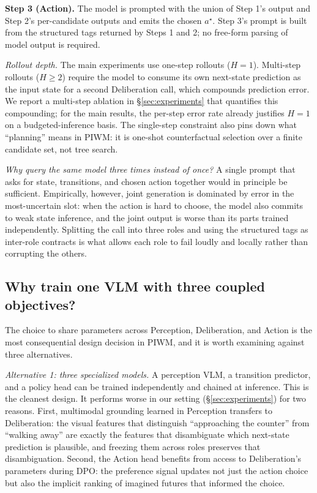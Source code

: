 \documentclass{article}
\begin{document}
\textbf{Step 3 (Action).}
The model is prompted with the union of Step 1's output and Step 2's per-candidate outputs and emits the chosen $a^\star$. Step 3's prompt is built from the structured tags returned by Steps 1 and 2; no free-form parsing of model output is required.

\textit{Rollout depth.}
The main experiments use one-step rollouts ($H=1$). Multi-step rollouts ($H \ge 2$) require the model to consume its own next-state prediction as the input state for a second Deliberation call, which compounds prediction error. We report a multi-step ablation in §\ref{sec:experiments} that quantifies this compounding; for the main results, the per-step error rate already justifies $H=1$ on a budgeted-inference basis. The single-step constraint also pins down what ``planning'' means in PIWM: it is one-shot counterfactual selection over a finite candidate set, not tree search.

\textit{Why query the same model three times instead of once?}
A single prompt that asks for state, transitions, and chosen action together would in principle be sufficient. Empirically, however, joint generation is dominated by error in the most-uncertain slot: when the action is hard to choose, the model also commits to weak state inference, and the joint output is worse than its parts trained independently. Splitting the call into three roles and using the structured tags as inter-role contracts is what allows each role to fail loudly and locally rather than corrupting the others.

\subsection{Why train one VLM with three coupled objectives?}
\label{sec:method:coupling}

The choice to share parameters across Perception, Deliberation, and Action is the most consequential design decision in PIWM, and it is worth examining against three alternatives.

\textit{Alternative 1: three specialized models.}
A perception VLM, a transition predictor, and a policy head can be trained independently and chained at inference. This is the cleanest design. It performs worse in our setting (§\ref{sec:experiments}) for two reasons. First, multimodal grounding learned in Perception transfers to Deliberation: the visual features that distinguish ``approaching the counter'' from ``walking away'' are exactly the features that disambiguate which next-state prediction is plausible, and freezing them across roles preserves that disambiguation. Second, the Action head benefits from access to Deliberation's parameters during DPO: the preference signal updates not just the action choice but also the implicit ranking of imagined futures that informed the choice.
\end{document}
